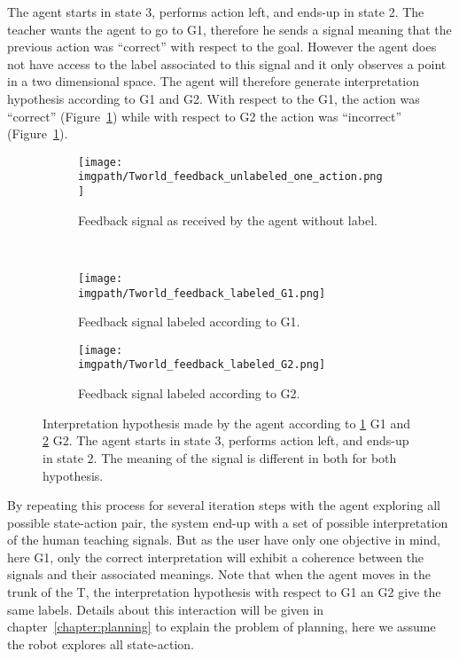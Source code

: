 The agent starts in state 3, performs action left, and ends-up in state 2. The teacher wants the agent to go to G1, therefore he sends a signal meaning that the previous action was ``correct'' with respect to the goal. However the agent does not have access to the label associated to this signal and it only observes a point in a two dimensional space. The agent will therefore generate interpretation hypothesis according to G1 and G2. With respect to the G1, the action was ``correct'' (Figure~\ref{fig:TworldLabelG1}) while with respect to G2 the action was ``incorrect'' (Figure~\ref{fig:TworldLabelG1}).

\begin{figure}[!ht]
    \centering
    \begin{subfigure}[b]{\tworldsize\columnwidth}
        \centering
        \texttt{[image: \\imgpath/Tworld\_feedback\_unlabeled\_one\_action.png]}
        \caption{Feedback signal as received by the agent without label.}
    \end{subfigure}\\
    \begin{subfigure}[b]{\tworldsize\columnwidth}
        \centering
        \texttt{[image: \\imgpath/Tworld\_feedback\_labeled\_G1.png]}
        \caption{Feedback signal labeled according to G1.}
        \label{fig:TworldLabelG1}
    \end{subfigure}
    \begin{subfigure}[b]{\tworldsize\columnwidth}
        \centering
        \texttt{[image: \\imgpath/Tworld\_feedback\_labeled\_G2.png]}
        \caption{Feedback signal labeled according to G2.}
        \label{fig:TworldLabelG2}
    \end{subfigure}
    \caption{Interpretation hypothesis made by the agent according to \ref{fig:TworldLabelG1} G1 and \ref{fig:TworldLabelG2} G2. The agent starts in state 3, performs action left, and ends-up in state 2. The meaning of the signal is different in both for both hypothesis.}
    \label{fig:TworldLabel}
\end{figure}

By repeating this process for several iteration steps with the agent exploring all possible state-action pair, the system end-up with a set of possible interpretation of the human teaching signals. But as the user have only one objective in mind, here G1, only the correct interpretation will exhibit a coherence between the signals and their associated meanings. Note that when the agent moves in the trunk of the T, the interpretation hypothesis with respect to G1 an G2 give the same labels. Details about this interaction will be given in chapter~\ref{chapter:planning} to explain the problem of planning, here we assume the robot explores all state-action.

